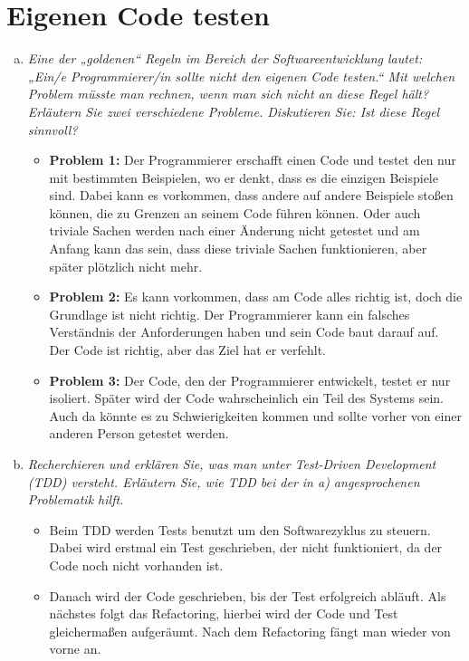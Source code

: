 \section{Eigenen Code testen}
\begin{enumerate}[(a)]
    \item{\itshape Eine der „goldenen“ Regeln im Bereich der Softwareentwicklung lautet:
„Ein/e Programmierer/in sollte nicht den eigenen Code testen.“
Mit welchen Problem müsste man rechnen, wenn man sich nicht an diese Regel hält?
Erläutern Sie zwei verschiedene Probleme.
Diskutieren Sie: Ist diese Regel sinnvoll?}
\begin{itemize}
    \item \textbf{Problem 1:} Der Programmierer erschafft einen Code und testet den nur mit bestimmten Beispielen, wo er denkt, dass es die einzigen Beispiele sind. Dabei kann es vorkommen, dass andere auf andere Beispiele stoßen können, die zu Grenzen an seinem Code führen können.
    Oder auch triviale Sachen werden nach einer Änderung nicht getestet und am Anfang kann das sein, dass diese triviale Sachen funktionieren, aber später plötzlich nicht mehr.
    \item \textbf{Problem 2:} Es kann vorkommen, dass am Code alles richtig ist, doch die Grundlage ist nicht richtig. Der Programmierer kann ein falsches Verständnis der Anforderungen haben und sein Code baut darauf auf. Der Code ist richtig, aber das Ziel hat er verfehlt.
    \item \textbf{Problem 3:} Der Code, den der Programmierer entwickelt, testet er nur isoliert. Später wird der Code wahrscheinlich ein Teil des Systems sein. Auch da könnte es zu Schwierigkeiten kommen und sollte vorher von einer anderen Person getestet werden.
\end{itemize}
\item{\itshape Recherchieren und erklären Sie, was man unter Test-Driven Development (TDD) versteht.
Erläutern Sie, wie TDD bei der in a) angesprochenen Problematik hilft.}\\
\begin{itemize}
    \item Beim TDD werden Tests benutzt um den Softwarezyklus zu steuern. Dabei wird erstmal ein Test geschrieben, der nicht funktioniert, da der Code noch nicht vorhanden ist.
    \item Danach wird der Code geschrieben, bis der Test erfolgreich abläuft. Als nächstes folgt das Refactoring, hierbei wird der Code und Test gleichermaßen aufgeräumt. Nach dem Refactoring fängt man wieder von vorne an.

\end{itemize}
\end{enumerate}
